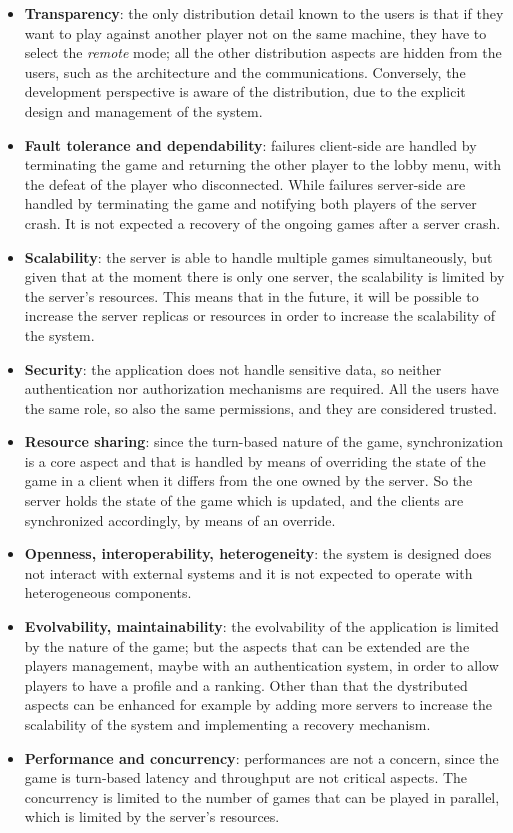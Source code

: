 \documentclass{scrartcl}
\begin{document}
\begin{itemize}
  \item \textbf{Transparency}: the only distribution detail known to the users is that if they want to play against
  another player not on the same machine, they have to select the \textit{remote} mode; all the other distribution
  aspects are hidden from the users, such as the architecture and the communications. Conversely, the development
  perspective is aware of the distribution, due to the explicit design and management of the system.
  \item \textbf{Fault tolerance and dependability}: failures client-side are handled by terminating the game and
  returning the other player to the lobby menu, with the defeat of the player who disconnected. While failures
  server-side are handled by terminating the game and notifying both players of the server crash. It is not
  expected a recovery of the ongoing games after a server crash.
  \item \textbf{Scalability}: the server is able to handle multiple games simultaneously, but given that at the moment
  there is only one server, the scalability is limited by the server's resources. This means that in the future,
  it will be possible to increase the server replicas or resources in order to increase the scalability of the system.
  \item \textbf{Security}: the application does not handle sensitive data, so neither authentication nor authorization
  mechanisms are required. All the users have the same role, so also the same permissions, and they are considered
  trusted.
  \item \textbf{Resource sharing}: since the turn-based nature of the game, synchronization is a core aspect and that
  is handled by means of overriding the state of the game in a client when it differs from the one owned by the
  server. So the server holds the state of the game which is updated, and the clients are synchronized accordingly,
  by means of an override.
  \item \textbf{Openness, interoperability, heterogeneity}: the system is designed does not interact with external
  systems and it is not expected to operate with heterogeneous components.
  \item \textbf{Evolvability, maintainability}: the evolvability of the application is limited by the nature of the
  game; but the aspects that can be extended are the players management, maybe with an authentication system, in
  order to allow players to have a profile and a ranking. Other than that the dystributed aspects can be enhanced
  for example by adding more servers to increase the scalability of the system and implementing a recovery mechanism.
  \item \textbf{Performance and concurrency}: performances are not a concern, since the game is turn-based latency and
  throughput are not critical aspects. The concurrency is limited to the number of games that can be played in
  parallel, which is limited by the server's resources.
\end{itemize}
\end{document}
